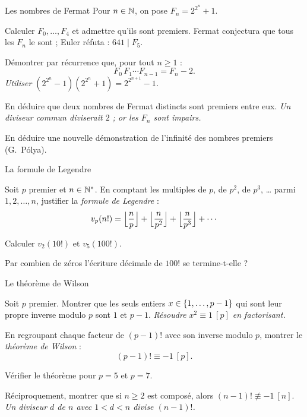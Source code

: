 \begin{exercice}[3]{Les nombres de Fermat}
Pour $n\in\mathbb{N}$, on pose $F_n=2^{2^{n}}+1$.
\begin{questions}
  \item Calculer $F_0,\dots,F_4$ et admettre qu'ils sont premiers. Fermat
    conjectura que tous les $F_n$ le sont ; Euler réfuta :
    $641\mid F_5$.
  \item Démontrer par récurrence que, pour tout $n\geq1$ :
    \[
      F_0\,F_1\cdots F_{n-1}=F_n-2.
    \]
    \emph{Utiliser $(2^{2^{n}}-1)(2^{2^{n}}+1)=2^{2^{n+1}}-1$.}
  \item En déduire que deux nombres de Fermat distincts sont premiers entre
    eux. \emph{Un diviseur commun diviserait $2$ ; or les $F_n$ sont impairs.}
  \item En déduire une nouvelle démonstration de l'infinité des nombres
    premiers (G.~Pólya).
\end{questions}
\end{exercice}

\begin{exercice}[3]{La formule de Legendre}
\begin{questions}
  \item Soit $p$ premier et $n\in\mathbb{N}^{*}$. En comptant les multiples de $p$,
    de $p^{2}$, de $p^{3}$, \dots{} parmi $1,2,\dots,n$, justifier la
    \emph{formule de Legendre} :
    \[
      v_p(n!)=\Bigl\lfloor\frac{n}{p}\Bigr\rfloor
      +\Bigl\lfloor\frac{n}{p^{2}}\Bigr\rfloor
      +\Bigl\lfloor\frac{n}{p^{3}}\Bigr\rfloor+\cdots
    \]
  \item Calculer $v_2(10!)$ et $v_5(100!)$.
  \item Par combien de zéros l'écriture décimale de $100!$ se
    termine-t-elle ?
\end{questions}
\end{exercice}

\begin{exercice}[3]{Le théorème de Wilson}
\begin{questions}
  \item Soit $p$ premier. Montrer que les seuls entiers $x\in\left\{1,\dots,p-1\right\}$
    qui sont leur propre inverse modulo $p$ sont $1$ et $p-1$.
    \emph{Résoudre $x^{2}\equiv1\ [p]$ en factorisant.}
  \item En regroupant chaque facteur de $(p-1)!$ avec son inverse modulo
    $p$, montrer le \emph{théorème de Wilson} :
    \[
      (p-1)!\equiv-1\ [p].
    \]
  \item Vérifier le théorème pour $p=5$ et $p=7$.
  \item Réciproquement, montrer que si $n\geq2$ est composé, alors
    $(n-1)!\not\equiv-1\ [n]$. \emph{Un diviseur $d$ de $n$ avec
    $1<d<n$ divise $(n-1)!$.}
\end{questions}
\end{exercice}

